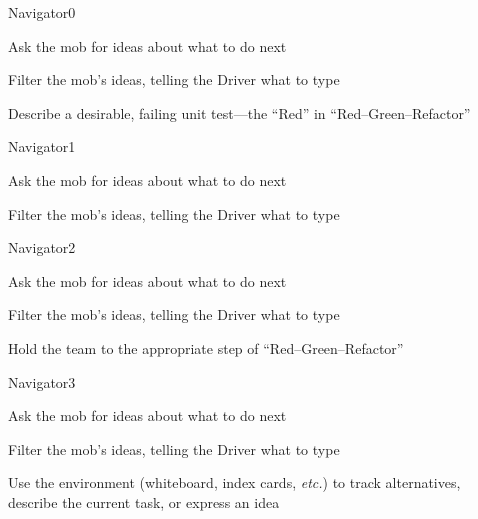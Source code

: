 \documentclass[letterpaper,20pt]{extarticle}
\begin{document}
\renewcommand{\blurb}{Listen and provide direction to the team}

\begin{role}{Navigator}{0}
  \item Ask the mob for ideas about what to do next
  \item Filter the mob's ideas, telling the Driver what to type
  \item Describe a desirable, failing unit test---the ``Red'' in ``Red--Green--Refactor''
\end{role}

\begin{role}{Navigator}{1}
  \item Ask the mob for ideas about what to do next
  \item Filter the mob's ideas, telling the Driver what to type
\end{role}

\begin{role}{Navigator}{2}
  \item Ask the mob for ideas about what to do next
  \item Filter the mob's ideas, telling the Driver what to type
  \item Hold the team to the appropriate step of ``Red--Green--Refactor''
\end{role}

\begin{role}{Navigator}{3}
  \item Ask the mob for ideas about what to do next
  \item Filter the mob's ideas, telling the Driver what to type
  \item Use the environment (whiteboard, index cards, \textit{etc.}) to
    track alternatives, describe the current task, or express
    an idea
\end{role}
\end{document}
